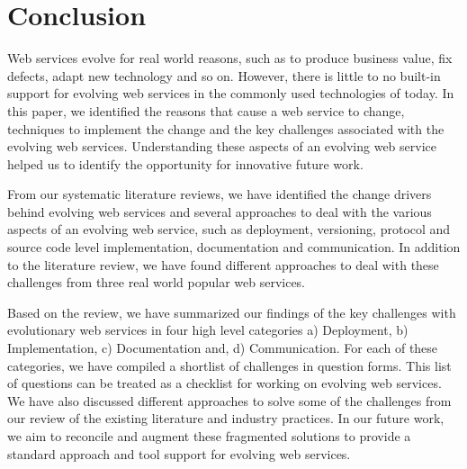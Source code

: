 \documentclass[runningheads,a4paper]{llncs}
\begin{document}
\section{Conclusion} %
\label{sec:conclusion}
Web services evolve for real world reasons, such as to produce business value, fix defects, adapt new technology and so on. However, there is little to no built-in support for evolving web services in the commonly used technologies of today. In this paper, we identified the reasons that cause a web service to change, techniques to implement the change and the key challenges associated with the evolving web services. Understanding these aspects of an evolving web service helped us to identify the opportunity for innovative future work.

From our systematic literature reviews, we have identified the change drivers behind evolving web services and several approaches to deal with the various aspects of an evolving web service, such as deployment, versioning, protocol and source code level implementation, documentation and communication. In addition to the literature review, we have found different approaches to deal with these challenges from three real world popular web services.

Based on the review, we have summarized our findings of the key challenges with evolutionary web services in four high level categories a) Deployment, b) Implementation, c) Documentation and, d) Communication. For each of these categories, we have compiled a shortlist of challenges in question forms. This list of questions can be treated as a checklist for working on evolving web services. We have also discussed different approaches to solve some of the challenges from our review of the existing literature and industry practices. In our future work, we aim to reconcile and augment these fragmented solutions to provide a standard approach and tool support for evolving web services.
\end{document}
